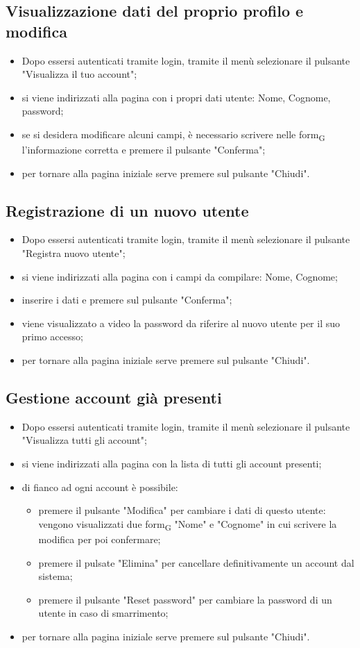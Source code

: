 \subsection{Visualizzazione dati del proprio profilo e modifica}
\begin{itemize}
    \item Dopo essersi autenticati tramite login, tramite il menù selezionare il pulsante "Visualizza il tuo account";
    \item si viene indirizzati alla pagina con i propri dati utente: Nome, Cognome, password;
    \item se si desidera modificare alcuni campi, è necessario scrivere nelle form\textsubscript{G} l'informazione corretta e premere il pulsante "Conferma";
    \item per tornare alla pagina iniziale serve premere sul pulsante "Chiudi".
\end{itemize}
\subsection{Registrazione di un nuovo utente}
\begin{itemize}
    \item Dopo essersi autenticati tramite login, tramite il menù selezionare il pulsante "Registra nuovo utente";
    \item si viene indirizzati alla pagina con i campi da compilare: Nome, Cognome;
    \item inserire i dati e premere sul pulsante "Conferma";
    \item viene visualizzato a video la password da riferire al nuovo utente per il suo primo accesso;
    \item per tornare alla pagina iniziale serve premere sul pulsante "Chiudi".
\end{itemize}
\subsection{Gestione account già presenti}
\begin{itemize}
    \item Dopo essersi autenticati tramite login, tramite il menù selezionare il pulsante "Visualizza tutti gli account";
    \item si viene indirizzati alla pagina con la lista di tutti gli account presenti;
    \item di fianco ad ogni account è possibile:
        \begin{itemize}
            \item premere il pulsante "Modifica" per cambiare i dati di questo utente: vengono visualizzati due form\textsubscript{G} "Nome" e "Cognome" in cui scrivere la modifica per poi confermare;
            \item premere il pulsate "Elimina" per cancellare definitivamente un account dal sistema;
            \item premere il pulsante "Reset password" per cambiare la password di un utente in caso di smarrimento;
        \end{itemize}
    \item per tornare alla pagina iniziale serve premere sul pulsante "Chiudi".
\end{itemize}
